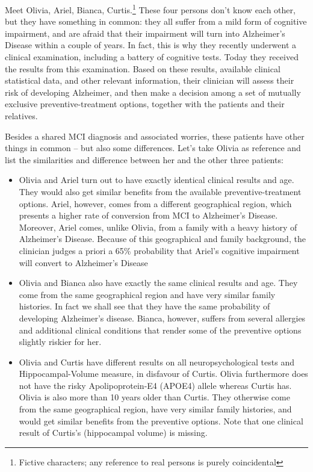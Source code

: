 \documentclass[utf8]{FrontiersinHarvard} %
\renewcommand*{\|}[1][]{\nonscript\:#1\vert\nonscript\:\mathopen{}}
\newcommand*{\ad}{Alzheimer's Disease}
\begin{document}
Meet Olivia, Ariel, Bianca, Curtis.\footnote{Fictive characters; any reference to real persons is purely coincidental}
These four persons don't know each other, but they have something in common: they all suffer from a mild form of cognitive impairment, and are afraid that their impairment will turn into Alzheimer's Disease within a couple of years. In fact, this is why they recently underwent a clinical examination, including a battery of cognitive tests. Today they received the results from this examination. Based on these results, available clinical statistical data, and other relevant information, their clinician will
assess their risk of developing Alzheimer, and then make a decision among a set of mutually exclusive preventive-treatment options, together with the patients and their relatives.

Besides a shared MCI diagnosis and associated worries, these patients have other things in common -- but also some differences. Let's take Olivia as reference and list the similarities and difference between her and the other three patients:
\begin{itemize}
\item Olivia and Ariel turn out to have exactly identical clinical results and age. They would also get similar benefits from the available preventive-treatment options. Ariel, however, comes from a different geographical region, which presents a higher rate of conversion from MCI to \ad. Moreover, Ariel comes, unlike Olivia, from a family with a heavy history of Alzheimer's Disease. Because of this geographical and family background, the clinician judges a priori a 65\% probability that Ariel's cognitive impairment will convert to Alzheimer's Disease

\item Olivia and Bianca also have exactly the same clinical results and age. They come from the same geographical region and have very similar family histories. In fact we shall see that they have the same probability of developing Alzheimer's disease. Bianca, however, suffers from several allergies and additional clinical conditions that render some of the preventive options slightly riskier for her.

\item Olivia and Curtis have different results on all neuropsychological tests and Hippocampal-Volume measure, in disfavour of Curtis. Olivia furthermore does not have the risky Apolipoprotein-E4 (APOE4) allele \citep{liuetal2013} whereas Curtis has. Olivia is also more than 10 years older than Curtis. They otherwise come from the same geographical region, have very similar family histories, and would get similar benefits from the preventive options. Note that one clinical result of Curtis's (hippocampal volume) is missing.
\end{itemize}
\end{document}
